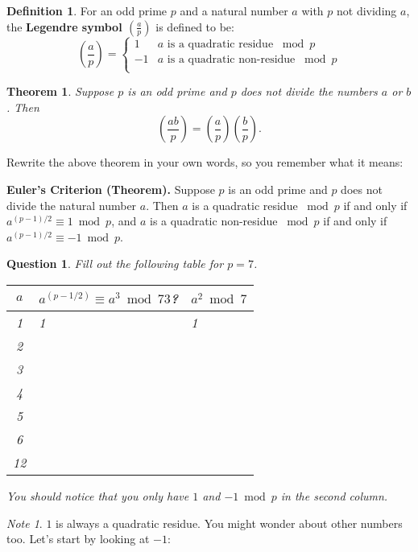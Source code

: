 \documentclass[12pt]{amsart}
\theoremstyle{plain}
\newtheorem{thm}{Theorem}
\newtheorem{quest}{Question}
\theoremstyle{definition}
\newtheorem*{defn}{Definition}
\theoremstyle{remark}
\newtheorem*{note}{Note}
\begin{document}
\begin{defn} For an odd prime $p$ and a natural number $a$ with $p$ not dividing $a$, the \textbf{Legendre symbol $\left( \frac{a}{p}\right)$} is defined to be:
\[ \left( \frac{a}{p}\right) = \begin{cases} 
      1 & a \text{ is a quadratic residue } \bmod p \\
      -1 & a \text{ is a quadratic non-residue } \bmod p \\
   \end{cases}
\]
\end{defn}

\begin{thm}
Suppose $p$ is an odd prime and $p$ does not divide the numbers $a$ or $b$.  Then $$\left( \frac{ab}{p}\right) = \left( \frac{a}{p}\right)\left( \frac{b}{p}\right).$$
\end{thm}

Rewrite the above theorem in your own words, so you remember what it means:\\ \vspace{1in}

\noindent \textbf{Euler's Criterion (Theorem).}
Suppose $p$ is an odd prime and $p$ does not divide the natural number $a$.  Then $a$ is a quadratic residue $\bmod p$ if and only if $a^{(p-1)/2} \equiv 1 \bmod p$, and $a$ is a quadratic non-residue $\bmod p$ if and only if $a^{(p-1)/2} \equiv -1 \bmod p$.

\newpage \begin{quest} 
Fill out the following table for $p = 7$.
\begin{center}
\begin{tabular}{|c|p{2in}|p{2in}|} \hline
$a$ & $a^{(p-1/2)} \equiv a^3 \bmod 73$? & $a^2 \bmod 7$\\ \hline
1&1&1\\ [.2in]
2&&\\ [.2in]
3&&\\ [.2in]
4&&\\ [.2in]
5&&\\ [.2in]
6&&\\ [.2in]
12&&\\  [.2in]\hline
\end{tabular}
\end{center}
You should notice that you only have $1$ and $-1 \bmod p$ in the second column.
\end{quest}

\begin{note}
$1$ is always a quadratic residue.  You might wonder about other numbers too.  Let's start by looking at $-1$:
\end{note}
\end{document}
